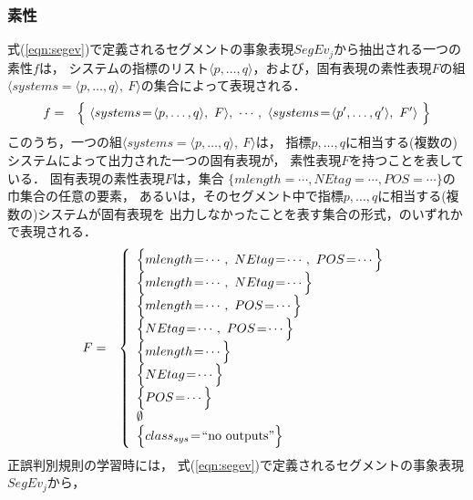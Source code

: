 \subsubsection{素性}
\label{subsubsec:ftr}

式(\ref{eqn:segev})で定義されるセグメントの事象表現$SegEv_j$から抽出される一つの素性$f$は，
システムの指標のリスト$\langle p,\ldots,q\rangle$，および，固有表現の素性表現$F$の組
$\langle systems\!=\! \langle p,\ldots,q\rangle,\ F \rangle$の集合によって表現される． 
\begin{eqnarray}
f & = &	\Bigl\{\
	 \langle 
	 systems\!=\!
	 \langle p,\ldots,q\rangle,\ F \rangle, 
\ \cdots, 
\  
	 \langle 
	 systems\!=\!
	 \langle p',\ldots,q'\rangle,\ F' \rangle 
	 \ \Bigr\} \label{eqn:ftr} 
\end{eqnarray}
このうち，一つの組$\langle systems\!=\! \langle p,\ldots,q\rangle,\ F \rangle$は，
指標$p,\ldots,q$に相当する(複数の)システムによって出力された一つの固有表現が，
素性表現$F$を持つことを表している．
固有表現の素性表現$F$は，集合
$\{mlength\!=\!\cdots, NEtag\!=\!\cdots, POS\!=\!\cdots\}$の
巾集合の任意の要素，
あるいは，そのセグメント中で指標$p,\ldots,q$に相当する(複数の)システムが固有表現を
出力しなかったことを表す集合の形式，のいずれかで表現される．
\begin{eqnarray}
F  & = & 
 \left\{\begin{array}{l}
      \Bigl\{
       mlength\!=\!\cdots,\  NEtag\!=\!\cdots,\
  		 POS\!=\!\cdots\Bigr\} \nonumber \\
       \Bigl\{
       mlength\!=\!\cdots,\  NEtag\!=\!\cdots\Bigr\} \nonumber \\
       \Bigl\{
       mlength\!=\!\cdots,\ POS\!=\!\cdots\Bigr\} \nonumber \\
     \Bigl\{
       NEtag\!=\!\cdots,\
  		 POS\!=\!\cdots\Bigr\} \nonumber \\
 
       \Bigl\{
     mlength\!=\!\cdots \Bigr\} \nonumber \\
       \Bigl\{
      NEtag\!=\!\cdots \Bigr\} \nonumber \\
       \Bigl\{
       POS\!=\!\cdots \Bigr\} \nonumber \\
       \emptyset \nonumber \\
       \Bigl\{
          class_{sys}\!=\! \mbox{``no outputs''} \Bigr\} \nonumber
	\end{array}\right.
\end{eqnarray}
正誤判別規則の学習時には，
式(\ref{eqn:segev})で定義されるセグメントの事象表現$SegEv_j$から，
